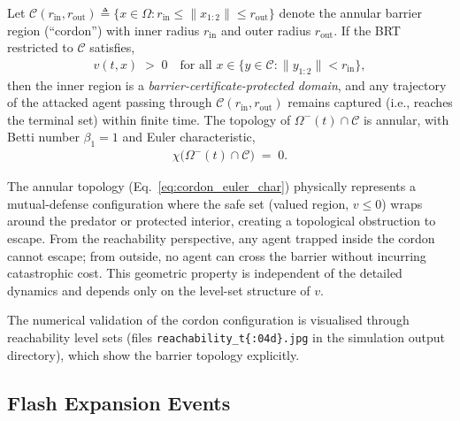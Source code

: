 \begin{proposition}
\label{prop:cordon}
Let $\mathcal{C}(r_{\mathrm{in}}, r_{\mathrm{out}}) \triangleq \{x \in \Omega : r_{\mathrm{in}}
\leq \|x_{1:2}\| \leq r_{\mathrm{out}}\}$ denote the annular barrier region (``cordon'')
with inner radius $r_{\mathrm{in}}$ and outer radius $r_{\mathrm{out}}$.
If the BRT restricted to $\mathcal{C}$ satisfies,
%
\begin{align}
\label{eq:cordon_euler}
v(t, x) \;>\; 0 \quad \text{for all } x \in \{y \in \mathcal{C} : \|y_{1:2}\| < r_{\mathrm{in}}\},
\end{align}
%
then the inner region is a \emph{barrier-certificate-protected domain}, and any trajectory of
the attacked agent passing through $\mathcal{C}(r_{\mathrm{in}}, r_{\mathrm{out}})$ remains captured
(i.e., reaches the terminal set) within finite time. The topology of $\Omega^{-}(t) \cap \mathcal{C}$
is annular, with Betti number $\beta_1 = 1$ and Euler characteristic,
%
\begin{align}
\label{eq:cordon_euler_char}
\chi\bigl(\Omega^{-}(t) \cap \mathcal{C}\bigr) \;=\; 0.
\end{align}
\end{proposition}

\begin{remark}
\label{rem:barrier_cert}
The annular topology (Eq.~\eqref{eq:cordon_euler_char}) physically represents
a mutual-defense configuration where the safe set (valued region, $v \leq 0$)
wraps around the predator or protected interior, creating a topological
obstruction to escape. From the reachability perspective, any agent trapped
inside the cordon cannot escape; from outside, no agent can cross the barrier
without incurring catastrophic cost. This geometric property is independent
of the detailed dynamics and depends only on the level-set structure of $v$.
\end{remark}

The numerical validation of the cordon configuration is visualised through
reachability level sets (files \texttt{reachability\_t\{:\!04d\}.jpg} in
the simulation output directory), which show the barrier topology explicitly.

\subsection{Flash Expansion Events}
\label{sec:d311_flash}

